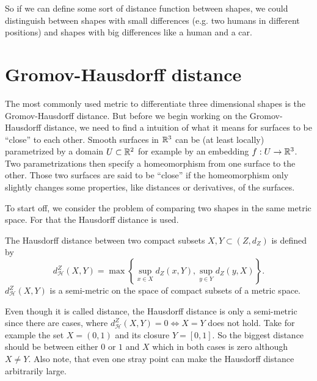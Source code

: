 So if we can define some sort of distance function between shapes, we could distinguish between shapes with small differences (e.g. two humans in different positions) and shapes with big differences like a human and a car.

\section{Gromov-Hausdorff distance}
The most commonly used metric to differentiate three dimensional shapes is the Gromov-Hausdorff distance.
But before we begin working on the Gromov-Hausdorff distance, we need to find a intuition of what it means for surfaces to be ``close'' to each other.
Smooth surfaces in $\mathbb{R}^3$ can be (at least locally) parametrized by a domain $U \subset \mathbb{R}^2$ for example by an embedding $f: U\rightarrow \mathbb{R}^3$.
Two parametrizations then specify a homeomorphism from one surface to the other.
Those two surfaces are said to be ``close'' if the homeomorphism only slightly changes some properties, like distances or derivatives, of the surfaces.

To start off, we consider the problem of comparing two shapes in the same metric space.
For that the Hausdorff distance is used.
\begin{mydef}
	The Hausdorff distance between two compact subsets $X,Y \subset (Z,d_Z)$ is defined by
	$$d^Z_\mathcal{H}(X,Y) = \max \left\{ \sup_{x \in X} d_Z(x,Y), \sup_{y \in Y} d_Z(y,X)\right\}.$$
	$d^Z_\mathcal{H}(X,Y)$ is a semi-metric on the space of compact subsets of a metric space.
\end{mydef}
Even though it is called distance, the Hausdorff distance is only a semi-metric since there are cases, where $d^Z_\mathcal{H}(X,Y) = 0 \Leftrightarrow X = Y$ does not hold.
Take for example the set $X = (0,1)$ and its closure $Y = [0,1]$.
So the biggest distance should be between either $0$ or $1$ and $X$ which in both cases is zero although $X \neq Y$.
Also note, that even one stray point can make the Hausdorff distance arbitrarily large.

